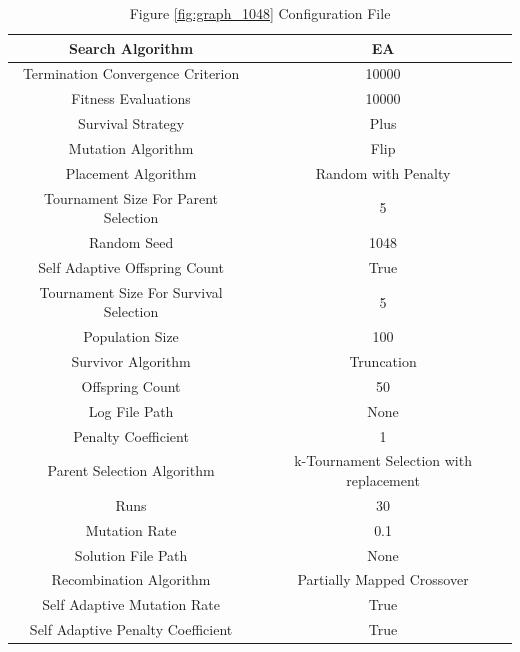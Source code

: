 \documentclass{standalone}
\begin{document}
\begin{table}[!htb]
	\centering
	\caption{Figure \ref{fig:graph_1048} Configuration File}
	\label{tab:graph_1048}
	\begin{tabular}{| c | c |}
		\hline
		Search Algorithm		& EA		 \\
		\hline
		Termination Convergence Criterion		& 10000		 \\
		\hline
		Fitness Evaluations		& 10000		 \\
		\hline
		Survival Strategy		& Plus		 \\
		\hline
		Mutation Algorithm		& Flip		 \\
		\hline
		Placement Algorithm		& Random with Penalty		 \\
		\hline
		Tournament Size For Parent Selection		& 5		 \\
		\hline
		Random Seed		& 1048		 \\
		\hline
		Self Adaptive Offspring Count		& True		 \\
		\hline
		Tournament Size For Survival Selection		& 5		 \\
		\hline
		Population Size		& 100		 \\
		\hline
		Survivor Algorithm		& Truncation		 \\
		\hline
		Offspring Count		& 50		 \\
		\hline
		Log File Path		& None		 \\
		\hline
		Penalty Coefficient		& 1		 \\
		\hline
		Parent Selection Algorithm		& k-Tournament Selection with replacement		 \\
		\hline
		Runs		& 30		 \\
		\hline
		Mutation Rate		& 0.1		 \\
		\hline
		Solution File Path		& None		 \\
		\hline
		Recombination Algorithm		& Partially Mapped Crossover		 \\
		\hline
		Self Adaptive Mutation Rate		& True		 \\
		\hline
		Self Adaptive Penalty Coefficient		& True		 \\
		\hline
	\end{tabular}
\end{table}
\end{document}
